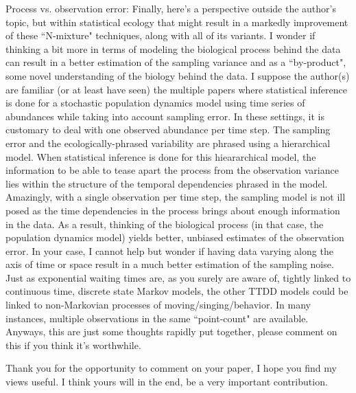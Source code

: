 \documentclass[12pt]{article}
\begin{document}
Process vs. observation error: Finally, here's a perspective outside the author's topic, but within statistical ecology that might result in a markedly improvement of these ``N-mixture" techniques, along with all of its variants. I wonder if thinking a bit more in terms of modeling the biological process behind the data can result in a better estimation of the sampling variance and as a ``by-product", some novel understanding of the biology behind the data. I suppose the author(s) are familiar (or at least have seen) the multiple papers where statistical inference is done for a stochastic population dynamics model using time series of abundances while taking into account sampling error. In these settings, it is customary to deal with one observed abundance per time step. The sampling error and the ecologically-phrased variability are phrased using a hierarchical model.  When statistical inference is done for this hieararchical model, the information to be able to tease apart
the process from the observation variance lies within the structure of the temporal dependencies phrased in the model. Amazingly, with a single observation per time step, the sampling model is not ill posed as the time dependencies in the process brings about enough information in the data.  As a result, thinking of the biological process (in that case, the population dynamics model) yields better, unbiased estimates of the observation error. In your case, I cannot help but wonder if having data varying along the axis of time or space result in a much better estimation of the sampling noise. Just as exponential waiting times are, as you surely are aware of, tightly linked to continuous time, discrete state Markov models, the other TTDD models could be linked to non-Markovian processes of moving/singing/behavior.  In many instances, multiple observations in the same ``point-count" are available. Anyways, this are just some thoughts rapidly put together, please comment on this
if you think it's worthwhile.

Thank you for the opportunity to comment on your paper, I hope you find my views useful.  I think yours will in the end, be a very important contribution.





\end{document}
